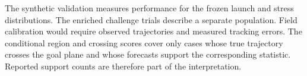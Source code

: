 The synthetic validation measures performance for the frozen launch and stress distributions. The enriched challenge trials describe a separate population. Field calibration would require observed trajectories and measured tracking errors. The conditional region and crossing scores cover only cases whose true trajectory crosses the goal plane and whose forecasts support the corresponding statistic. Reported support counts are therefore part of the interpretation.
